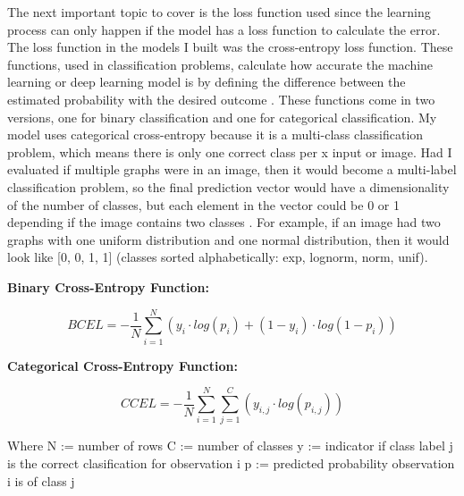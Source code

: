 \documentclass[12pt]{article}
\begin{document}
                The next important topic to cover is the loss function used since the learning process can only happen 
                if the model has a loss function to calculate the error. 
                The loss function in the models I built was the cross-entropy loss function. 
                These functions, used in classification problems, calculate how accurate the machine learning 
                or deep learning model is by defining the difference between the estimated probability 
                with the desired outcome \cite{365team2023}. These functions come in two versions, 
                one for binary classification and one for categorical classification. 
                My model uses categorical cross-entropy because it is a multi-class classification problem, 
                which means there is only one correct class per x input or image. Had I evaluated if multiple graphs were in an image,
                then it would become a multi-label classification problem, so the final prediction vector would have
                a dimensionality of the number of classes, but each element in the vector could be 0 or 1 depending 
                if the image contains two classes \cite{gomez2018}. For example, if an image had two graphs with one uniform distribution 
                and one normal distribution, then it would look like [0, 0, 1, 1] 
                (classes sorted alphabetically: exp, lognorm, norm, unif). 

                \textbf{Binary Cross-Entropy Function:}

                \begin{large}
                    
                    \[ BCEL = - \frac{1}{N} \sum_{i=1}^N (y_i \cdot log(p_i) + (1 - y_i) \cdot log(1-p_i)) \]

                \end{large}

                \textbf{Categorical Cross-Entropy Function:}
                
                \begin{large}
                    
                    \[ CCEL = - \frac{1}{N} \sum_{i=1}^N \sum_{j=1}^C (y_{i,j} \cdot log(p_{i,j})) \]

                \end{large}

                \noindent Where N := number of rows \newline
                C := number of classes \newline
                y := indicator if class label j is the correct clasification for observation i \newline
                p := predicted probability observation i is of class j
\end{document}

